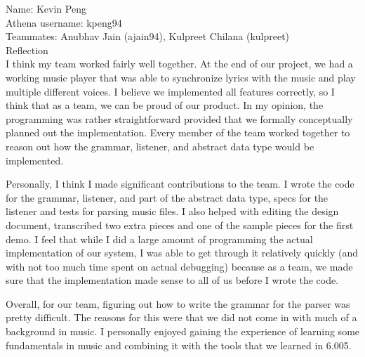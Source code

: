 \documentclass[12pt,oneside]{article}
\begin{document}
\noindent Name: Kevin Peng \\
Athena username: kpeng94\\
Teammates: Anubhav Jain (ajain94), Kulpreet Chilana (kulpreet)\\
Reflection\\

I think my team worked fairly well together. At the end of our project, we had a working music player that was able to synchronize lyrics with the music and play multiple different voices. I believe we implemented all features correctly, so I think that as a team, we can be proud of our product. In my opinion, the programming was rather straightforward provided that we formally conceptually planned out the implementation. Every member of the team worked together to reason out how the grammar, listener, and abstract data type would be implemented.

Personally, I think I made significant contributions to the team. I wrote the code for the grammar, listener, and part of the abstract data type, specs for the listener and tests for parsing music files. I also helped with editing the design document, transcribed two extra pieces and one of the sample pieces for the first demo. I feel that while I did a large amount of programming the actual implementation of our system, I was able to get through it relatively quickly (and with not too much time spent on actual debugging) because as a team, we made sure that the implementation made sense to all of us before I wrote the code.

Overall, for our team, figuring out how to write the grammar for the parser was pretty difficult. The reasons for this were that we did not come in with much of a background in music. I personally enjoyed gaining the experience of learning some fundamentals in music and combining it with the tools that we learned in 6.005.
\end{document}
